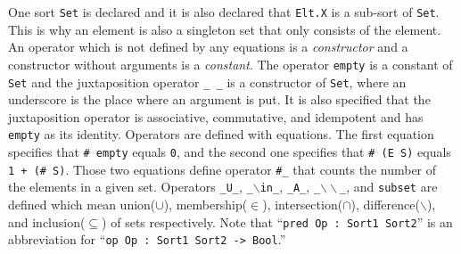 \documentclass[12pt]{report}
\newcommand{\stt}[1]{{\small{\tt {#1}}}}
\begin{document}
One sort {\tt Set} is declared and it is also declared that
{\tt Elt.X} is a sub-sort of {\tt Set}. This is why an element is also
a singleton set that only consists of the element. An operator which
is not defined by any equations is a {\it constructor} and a
constructor without arguments is a {\it constant}. The
operator {\tt empty} is a constant of {\tt Set} and the juxtaposition
operator {\tt \_ \_} is a constructor of {\tt Set}, where an
underscore is the place where an argument is put. It is also specified
that the juxtaposition operator is associative, commutative, and
idempotent and has {\tt empty} as its identity. Operators are defined
with equations. The first equation specifies that \stt{\# empty} equals
{\tt 0}, and the second one specifies that \stt{\# (E S)} equals \stt{1
  + (\# S)}. Those two equations define operator {\tt \#\_} that
counts the number of the elements in a given set. Operators
{\tt \_U\_}, {\tt \_$\backslash$in\_}, {\tt \_A\_}, {\tt \_$\backslash\backslash$\_}, and {\tt subset} are
defined which mean union($\cup$), membership($\in$),
intersection($\cap$), difference($\backslash$), and inclusion($\subseteq$) of sets respectively.
Note that ``\stt{pred~Op~:~Sort1~Sort2}'' is an abbreviation for ``\stt{op~Op~:~Sort1~Sort2~->~Bool}.''
\end{document}
